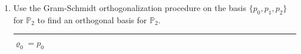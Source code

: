 \documentclass[12pt]{amsart}
\newcommand{\1}{\mathbbm{1}}
\numberwithin{equation}{section}
\numberwithin{Theorem}{section}
\theoremstyle{plain} %
\theoremstyle{definition}
\theoremstyle{remark}
\begin{document}
\begin{enumerate}[1.]
\begin{enumerate}[(a)]
\begin{proof}
		\begin{align*}
			c_1\mathbf{e}_1+c_2\mathbf{e}_2
			&= c_1\mathbf{v}_1+c_2\left( \mathbf{v}_2 - \frac{\langle\mathbf{e}_1,\mathbf{v}_2\rangle}{\|\mathbf{e}_1\|^2}\mathbf{e}_1 \right) \\
			&= c_1\mathbf{v}_1- c_2\left( \frac{\langle\mathbf{e}_1,\mathbf{v}_2\rangle}{\|\mathbf{e}_1\|^2}\mathbf{e}_1 \right) + c_2\mathbf{v}_2 \\
			&= c_1\mathbf{v}_1- c_2\left( \frac{\langle\mathbf{e}_1,\mathbf{v}_2\rangle}{\|\mathbf{e}_1\|^2}\mathbf{e}_1 \right) + c_2\mathbf{v}_2 \\
			&= c_1\mathbf{v}_1- c_2\left( \frac{\langle\mathbf{e}_1,\mathbf{v}_2\rangle}{\|\mathbf{e}_1\|^2}\mathbf{v}_1 \right) + c_2\mathbf{v}_2 \\
			&= \left(c_1- c_2 \frac{\langle\mathbf{e}_1,\mathbf{v}_2\rangle}{\|\mathbf{e}_1\|^2} \right)\mathbf{v}_1 + c_2\mathbf{v}_2.
		\end{align*}
		Thus \(\operatorname{span}\{\mathbf{e}_{1},\mathbf{e}_{2}\} \subseteq \operatorname{span}\{\mathbf{v}_{1},\mathbf{v}_{2}\}\). Because each span is a subset of the other we can conclude \(\operatorname{span}\{\mathbf{e}_{1},\mathbf{e}_{2}\} = \operatorname{span}\{\mathbf{v}_{1},\mathbf{v}_{2}\}\).
	\end{proof}
	

\end{enumerate}



\item\label{gsp} Use the Gram-Schmidt orthogonalization procedure on the basis \(\{p_{0},p_{1},p_{2}\}\) for \(\mathbb{P}_{2}\) to find an orthogonal basis for \(\mathbb{P}_{2}\).\bigskip

\hrule
\bigskip



\(\varrho_0=p_0\)


\end{enumerate}
\end{document}
